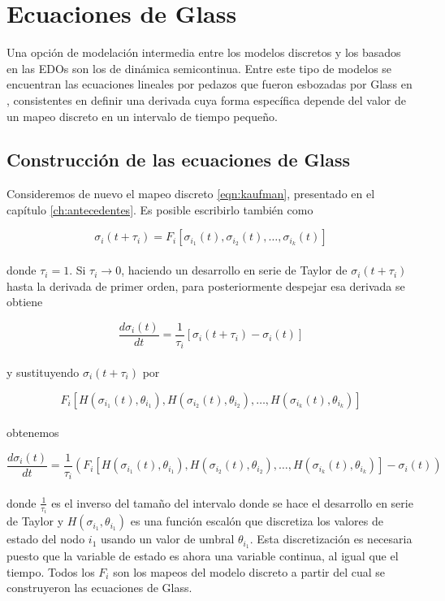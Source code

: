 \section{Ecuaciones de Glass}

Una opción de modelación intermedia entre los modelos discretos y los basados en las EDOs son los de dinámica semicontinua. Entre este tipo de modelos se encuentran las ecuaciones lineales por pedazos que fueron esbozadas por Glass en \citeauthor{Glass1973} \citep{Glass1973}, consistentes en definir una derivada cuya forma específica depende del valor de un mapeo discreto en un intervalo de tiempo pequeño. 

\subsection{Construcción de las ecuaciones de Glass}

Consideremos de nuevo el mapeo discreto \ref{eqn:kaufman}, presentado en el capítulo \ref{ch:antecedentes}.
Es posible escribirlo también como

\begin{equation}
\sigma_i(t+\tau_i)=F_i[\sigma_{i_1}(t),\sigma_{i_2}(t),\ldots,\sigma_{i_k}(t)]
\end{equation}
\\
donde $\tau_i=1$. Si $\tau_i \rightarrow 0$, haciendo un desarrollo en serie de Taylor de $\sigma_i(t+\tau_i)$ hasta la derivada de primer orden, para posteriormente despejar esa derivada se obtiene

\begin{equation}
\frac{d\sigma_i(t)}{dt} = \frac{1}{\tau_i} [\sigma_i(t+\tau_i) - \sigma_i(t)]
\end{equation}
\\
y sustituyendo $\sigma_i(t+\tau_i)$ por 

\begin{equation}
F_i[H(\sigma_{i_1}(t), \theta_{i_1}), H(\sigma_{i_2}(t), \theta_{i_2}),\ldots, H(\sigma_{i_k}(t), \theta_{i_k})]
\end{equation}
\\
obtenemos 

\begin{equation}
\frac{d\sigma_i(t)}{dt} = \frac{1}{\tau_i} (F_i[H(\sigma_{i_1}(t), \theta_{i_1}), H(\sigma_{i_2}(t), \theta_{i_2}),\ldots, H(\sigma_{i_k}(t), \theta_{i_k})] - \sigma_i(t))
\end{equation} 
\\
donde $\frac{1}{\tau_i}$ es el inverso del tamaño del intervalo donde se hace el desarrollo en serie de Taylor y $H(\sigma_{i_1}, \theta_{i_1})$ es una función escalón que discretiza los valores de estado del nodo $i_1$ usando un valor de umbral $\theta_{i_1}$. Esta discretización es necesaria puesto que la variable de estado es ahora una variable continua, al igual que el tiempo. Todos los $F_i$ son los mapeos del modelo discreto a partir del cual se construyeron las ecuaciones de Glass.

